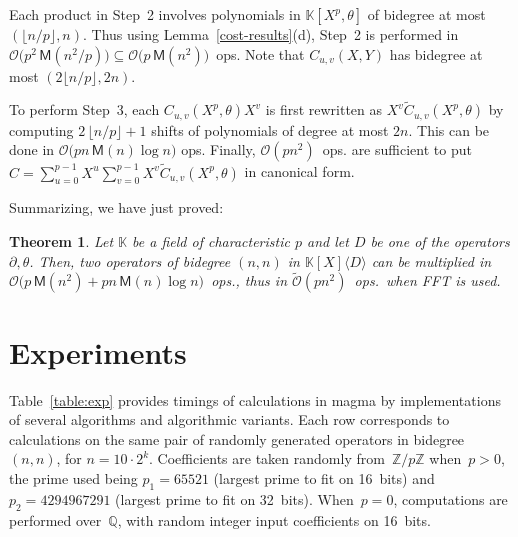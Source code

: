 \documentclass{sig-alt-full}
\newcommand{\x}{X}
\newcommand{\y}{Y}
\newcommand{\Tx}{\theta}
\newcommand{\Dx}{\partial}
\newcommand{\bigO}{{\mathcal{O}}}
\newcommand{\bigOsoft}{\tilde{\mathcal{O}}}
\newcommand{\sM}{\mathsf{M}}
\newcommand{\bK}{\mathbb{K}}
\newcommand{\bQ}{\mathbb{Q}}
\newcommand{\bZ}{\mathbb{Z}}
\newtheorem{theorem}{Theorem}
\begin{document}
Each product in Step~2 involves polynomials in $\bK[\x^p,\Tx]$ of bidegree at most $(\lfloor n/p \rfloor,n)$.
Thus using Lemma~\ref{cost-results}(d), Step~2 is performed in
$\bigO\bigl(p^2 \, \sM(n^2/p)\bigr) \subseteq \bigO\bigl(p \, \sM(n^2)\bigr)$~ops.
Note that $C_{u,v}(\x,\y)$ has bidegree at most $(2\lfloor n/p \rfloor, 2n)$.



To perform Step~3, each $C_{u,v}(\x^p,\Tx) \x^v$ is first rewritten as
$\x^v \tilde{C}_{u,v}(\x^p,\Tx)$ by computing $2\,\lfloor n/p \rfloor +1$
shifts of polynomials of degree at most $2n$. This can be done in $\bigO\bigl(pn\, \sM(n) \log n\bigr)$ ops.
{}Finally,  $\bigO(p n^2)$~ops. are sufficient to put $C = \sum_{u=0}^{p-1} \x^u \sum_{v=0}^{p-1} \x^v \tilde{C}_{u,v}(\x^p,\Tx)$ in canonical form.

Summarizing, we have just proved:
\begin{theorem}
Let\/ $\bK$ be a field of characteristic $p$ and let $D$ be one of the operators $\Dx, \Tx$.
Then, two operators of bidegree $(n,n)$ in $\bK[\x]\langle D\rangle$ can be multiplied in $\bigO\bigl(p \, \sM(n^2) + pn \, \sM(n) \log n\bigr)$~ops., thus in $\bigOsoft(pn^2)$~ops.\ when FFT is used.
\end{theorem}




\section{Experiments}\label{sec:Experiments}

Table~\ref{table:exp} provides timings of calculations in \textsf{magma} by implementations of several algorithms and algorithmic variants.
Each row corresponds to calculations on the same pair of randomly generated operators in bidegree $(n,n)$, for $n=10\cdot2^k$.
Coefficients are taken randomly from~$\bZ/p\bZ$ when~$p>0$, the prime used being
$p_1=65521$ (largest prime to fit on 16~bits) and $p_2=4294967291$ (largest prime to fit on 32~bits).
When~$p=0$, computations are performed over~$\bQ$, with random integer input coefficients on 16~bits.
\end{document}
